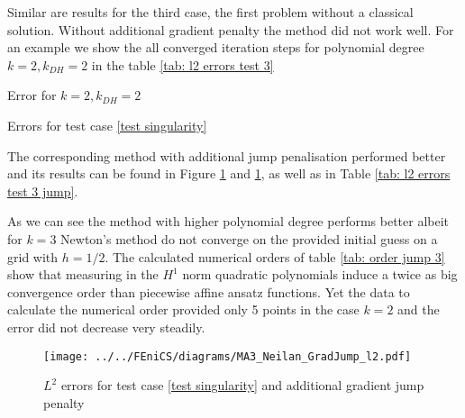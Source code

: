 Similar are results for the third case, the first problem without a classical solution. Without additional gradient penalty the method did not work well. For an example we show the all converged iteration steps for polynomial degree $k=2, k_{DH}=2$ in the table \ref{tab: l2 errors test 3}
\begin{table}[H]
		\centering
		\pgfplotstabletypeset[
		columns={iterations, l2error, h1error,N},
		    every row 0 column 0/.style={set content=init},
		]{\MAThreedegTwoTwo}
    	\caption{Error for $k=2, k_{DH}=2$}
	\caption{Errors for test case \ref{test singularity}}
	\label{tab: l2 errors test 3}
\end{table}

The corresponding method with additional jump penalisation performed better and its results can be found in Figure \ref{fig: l2 errors test 3 jump} and \ref{fig: l2 errors test 3 jump}, as well as in Table \ref{tab: l2 errors test 3 jump}. 

As we can see the method with higher polynomial degree performs better albeit for $k=3$ Newton's method do not converge on the provided initial guess on a grid with $h=1/2$. The calculated numerical orders of table \ref{tab: order jump 3} show that measuring in the $H^1$ norm quadratic polynomials induce a twice as big convergence order than piecewise affine ansatz functions. Yet the data to calculate the numerical order provided only 5 points in the case $k=2$ and the error did not decrease very steadily.

\begin{figure}[H]
	\centering
	\texttt{[image: ../../FEniCS/diagrams/MA3\_Neilan\_GradJump\_l2.pdf]}
	\caption{$L^2$ errors for test case \ref{test singularity} and additional gradient jump penalty}
	\label{fig: l2 errors test 3 jump}
\end{figure}

